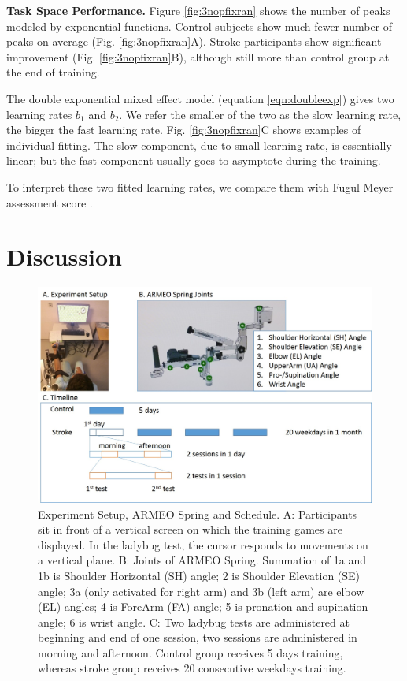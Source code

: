 \textbf{Task Space Performance.}
Figure \ref{fig:3nopfixran} shows the number of peaks modeled by exponential functions.
Control subjects show much fewer number of peaks on average (Fig. \ref{fig:3nopfixran}A).
Stroke participants show significant improvement (Fig. \ref{fig:3nopfixran}B), although still more than control group at the end of training.

The double exponential mixed effect model (equation \ref{eqn:doubleexp}) gives two learning rates $ b_1 $ and $ b_2 $. 
We refer the smaller of the two as the slow learning rate, the bigger the fast learning rate.
Fig. \ref{fig:3nopfixran}C shows examples of individual fitting.
The slow component, due to small learning rate, is essentially linear; but the fast component usually goes to asymptote during the training.

To interpret these two fitted learning rates, we compare them with Fugul Meyer assessment score \cite{}.



\section{Discussion}



\begin{figure}
	\centering
	\includegraphics[width=1\linewidth]{figures/1setup&schedule}
	\caption[Experiment Setup and Schedule]
	{Experiment Setup, ARMEO Spring and Schedule. 
		A: Participants sit in front of a vertical screen on which the training games are displayed. In the ladybug test, the cursor responds to movements on a vertical plane. 
		B: Joints of ARMEO Spring. Summation of 1a and 1b is Shoulder Horizontal (SH) angle; 2 is Shoulder Elevation (SE) angle; 3a (only activated for right arm) and 3b (left arm) are elbow (EL) angles; 4 is ForeArm (FA) angle; 5 is pronation and supination angle; 6 is wrist angle.
		C: Two ladybug tests are administered at beginning and end of one session, two sessions are administered in morning and afternoon. Control group receives 5 days training, whereas stroke group receives 20 consecutive weekdays training.}
	\label{fig:1setupschedule}
\end{figure}

